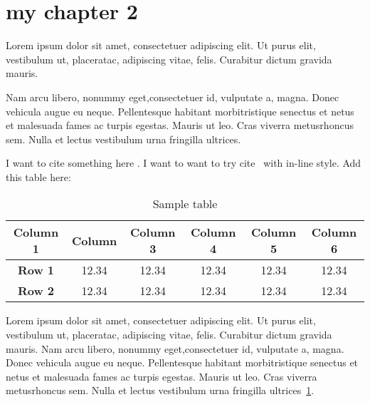 \section{my chapter 2}

Lorem ipsum dolor sit amet, consectetuer adipiscing elit.  Ut purus elit, vestibulum ut, placeratac,  adipiscing vitae,  felis.   Curabitur dictum gravida mauris.

Nam arcu libero,  nonummy eget,consectetuer id, vulputate a, magna. Donec vehicula augue eu neque. Pellentesque habitant morbitristique senectus et netus et malesuada fames ac turpis egestas. Mauris ut leo. Cras viverra metusrhoncus sem.  Nulla et lectus vestibulum urna fringilla ultrices.

I want to cite something here \parencite{fennell2018predicting}. I want to want to try cite~\textcite{zuo2019standing} with in-line style.
Add this table here:

\begin{table}[ht]
  \centering
  \captionsetup{width=0.8\linewidth} %
  \caption{Sample table}
  \begin{tabular}{cccccc}
    \hline
    \textbf{Column 1} & \textbf{Column} & \textbf{Column 3} & \textbf{Column 4} & \textbf{Column 5} & \textbf{Column 6} \\
    \hline
    \textbf{Row 1}    & 12.34           & 12.34             & 12.34             & 12.34             & 12.34             \\
    \hline
    \textbf{Row 2}    & 12.34           & 12.34             & 12.34             & 12.34             & 12.34             \\
    \hline
  \end{tabular}
  \label{table:table1}
\end{table}

Lorem ipsum dolor sit amet, consectetuer adipiscing elit.  Ut purus elit, vestibulum ut, placeratac,  adipiscing vitae,  felis.   Curabitur dictum gravida mauris.
Nam arcu libero,  nonummy eget,consectetuer id, vulputate a, magna. Donec vehicula augue eu neque. Pellentesque habitant morbitristique senectus et netus et malesuada fames ac turpis egestas. Mauris ut leo. Cras viverra metusrhoncus sem.  Nulla et lectus vestibulum urna fringilla ultrices~\cref{table:table1}.

